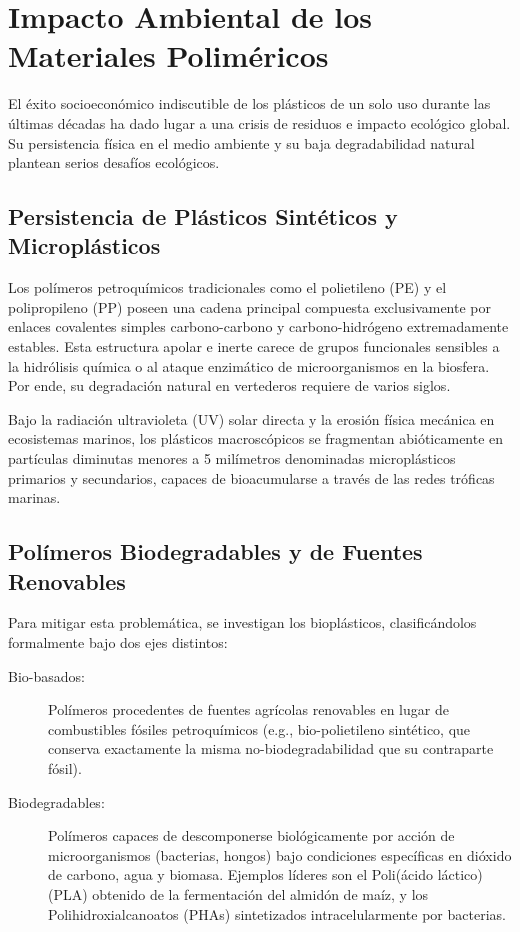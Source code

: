 \chapter{Impacto Ambiental de los Materiales Poliméricos}
\label{cap:ambiental}

El éxito socioeconómico indiscutible de los plásticos de un solo uso durante las últimas décadas ha dado lugar a una crisis de residuos e impacto ecológico global. Su persistencia física en el medio ambiente y su baja degradabilidad natural plantean serios desafíos ecológicos.

\section{Persistencia de Plásticos Sintéticos y Microplásticos}

Los polímeros petroquímicos tradicionales como el polietileno (PE) y el polipropileno (PP) poseen una cadena principal compuesta exclusivamente por enlaces covalentes simples carbono-carbono y carbono-hidrógeno extremadamente estables. Esta estructura apolar e inerte carece de grupos funcionales sensibles a la hidrólisis química o al ataque enzimático de microorganismos en la biosfera. Por ende, su degradación natural en vertederos requiere de varios siglos.

Bajo la radiación ultravioleta (UV) solar directa y la erosión física mecánica en ecosistemas marinos, los plásticos macroscópicos se fragmentan abióticamente en partículas diminutas menores a 5 milímetros denominadas microplásticos primarios y secundarios, capaces de bioacumularse a través de las redes tróficas marinas.

\section{Polímeros Biodegradables y de Fuentes Renovables}

Para mitigar esta problemática, se investigan los bioplásticos, clasificándolos formalmente bajo dos ejes distintos:

\begin{description}
    \item[Bio-basados:] Polímeros procedentes de fuentes agrícolas renovables en lugar de combustibles fósiles petroquímicos (e.g., bio-polietileno sintético, que conserva exactamente la misma no-biodegradabilidad que su contraparte fósil).
    \item[Biodegradables:] Polímeros capaces de descomponerse biológicamente por acción de microorganismos (bacterias, hongos) bajo condiciones específicas en dióxido de carbono, agua y biomasa. Ejemplos líderes son el Poli(ácido láctico) (PLA) obtenido de la fermentación del almidón de maíz, y los Polihidroxialcanoatos (PHAs) sintetizados intracelularmente por bacterias.
\end{description}

